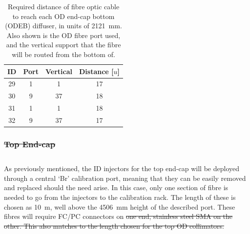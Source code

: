 \documentclass[a4paper,11pt]{article}
\providecommand{\DIFaddtex}[1]{{\protect\color{blue}\uwave{#1}}} %
\providecommand{\DIFdeltex}[1]{{\protect\color{red}\sout{#1}}}                      %
\providecommand{\DIFaddbegin}{} %
\providecommand{\DIFaddend}{} %
\providecommand{\DIFdelbegin}{} %
\providecommand{\DIFdelend}{} %
\providecommand{\DIFadd}[1]{\texorpdfstring{\DIFaddtex{#1}}{#1}} %
\providecommand{\DIFdel}[1]{\texorpdfstring{\DIFdeltex{#1}}{}} %
\newcommand{\DIFscaledelfig}{0.5}
\newlength{\DIFdelgraphicswidth} %
\newlength{\DIFdelgraphicsheight} %
\newcommand{\DIFaddincludegraphics}[2][]{{\color{blue}\fbox{\DIFOincludegraphics[#1]{#2}}}} %
\newcommand{\DIFdelincludegraphics}[2][]{%
\sbox{\DIFdelgraphicsbox}{\DIFOincludegraphics[#1]{#2}}%
\settoboxwidth{\DIFdelgraphicswidth}{\DIFdelgraphicsbox} %
\settoboxtotalheight{\DIFdelgraphicsheight}{\DIFdelgraphicsbox} %
\scalebox{\DIFscaledelfig}{%
\parbox[b]{\DIFdelgraphicswidth}{\usebox{\DIFdelgraphicsbox}\\[-\baselineskip] \rule{\DIFdelgraphicswidth}{0em}}\llap{\resizebox{\DIFdelgraphicswidth}{\DIFdelgraphicsheight}{%
\setlength{\unitlength}{\DIFdelgraphicswidth}%
\begin{picture}(1,1)%
\thicklines\linethickness{2pt} %
{\color[rgb]{1,0,0}\put(0,0){\framebox(1,1){}}}%
{\color[rgb]{1,0,0}\put(0,0){\line( 1,1){1}}}%
{\color[rgb]{1,0,0}\put(0,1){\line(1,-1){1}}}%
\end{picture}%
}\hspace*{3pt}}} %
} %
\DeclareRobustCommand{\DIFaddbegin}{\DIFOaddbegin \let\includegraphics\DIFaddincludegraphics} %
\DeclareRobustCommand{\DIFaddend}{\DIFOaddend \let\includegraphics\DIFOincludegraphics} %
\DeclareRobustCommand{\DIFdelbegin}{\DIFOdelbegin \let\includegraphics\DIFdelincludegraphics} %
\DeclareRobustCommand{\DIFdelend}{\DIFOaddend \let\includegraphics\DIFOincludegraphics} %
\begin{document}
\begin{table}[h!]
\centering
\begin{tabular}[t]{cccc}\toprule
ID	&	Port   &   Vertical	&	Distance [$u$]	\\ \midrule
29	&	1      &	1		&	17		\\
30	&	9      &	37		&	18		\\
31	&	1      &	1		&	18		\\
32	&	9      &	37		&	17		\\	\bottomrule
\end{tabular}
\caption{Required distance of fibre optic cable to reach each OD end-cap bottom (ODEB) diffuser, in units of 2121~mm. Also shown is the OD fibre port used, and the vertical support that the fibre will be routed from the bottom of.}\label{tab:bottomEndCapIDLen}
\end{table}



\DIFdelbegin \subsubsection{\DIFdel{Top End-cap}}%
\addtocounter{subsubsection}{-1}%
\DIFdelend \DIFaddbegin \subsection{\DIFadd{Top End-cap}}\label{sec:lengths:sub:top}
\DIFaddend 

As previously mentioned, the ID injectors for the top end-cap will be deployed through a central `Br' calibration port, meaning that they can be easily removed and replaced should the need arise. In this case, only one section of fibre is needed to go from the injectors to the calibration rack. The length of these is chosen as 10~m, well above the 4506~mm height of the described port. These fibres will require FC/PC connectors on \DIFdelbegin \DIFdel{one end, stainless steel SMA on the other.
This also matches to the length chosen for the top OD collimators.
}\DIFdelend \DIFaddbegin \DIFadd{both ends.
}\DIFaddend 
\end{document}
